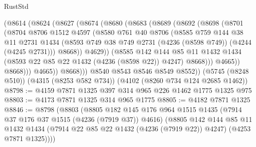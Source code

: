 \begin{lexlean}{RustStd}
\begin{coremodule}
              (@8614
                (@8624
                  (@8627
                    (@8674
                      (@8680
                        (@8683
                          (@8689
                            (@8692
                              (@8698
                                (@8701
                                  (@8704
                                    @8706
                                    @1512
                                    @4597
                                    (@8580
                                      @761
                                      @40
                                      @8706
                                      (@8585
                                        @759
                                        @144
                                        @38
                                        @11
                                        @2731
                                        @1434
                                        (@8593
                                          @749
                                          @38
                                          @749
                                          @2731
                                          (@4236 (@8598 @749))
                                          (@4244 (@4245 @2731)))
                                        @8668))
                                    @4629))
                                (@8585
                                  @142
                                  @144
                                  @85
                                  @11
                                  @1432
                                  @1434
                                  (@8593 @22 @85 @22 @1432 (@4236 (@8598 @22)) @4247)
                                  @8668)))
                            @4665))
                        @8668)))
                  @4665))
              @8668)))
        @8540
        @8543
        @8546
        @8549
        @8552))
    (@5745 (@8248 @510))
    (@4315 (@8253 @582 @734))
    (@4102 (@8260 @734 @124 @2685 @1462))
@8798 := @4159 @7871 @1325 @397 @314 @965 @226 @1462 @1775 @1325 @975
@8803 := @4173 @7871 @1325 @314 @965 @1775
@8805 := @4182 @7871 @1325
@8846 := @8798
    (@8803
      (@8805
        @182
        @145
        @176
        @964
        @1515
        @1435
        (@7914 @37 @176 @37 @1515 (@4236 (@7919 @37)) @4616)
        (@8805
          @142
          @144
          @85
          @11
          @1432
          @1434
          (@7914 @22 @85 @22 @1432 (@4236 (@7919 @22)) @4247)
          (@4253 @7871 @1325))))

\end{coremodule}
\end{lexlean}
